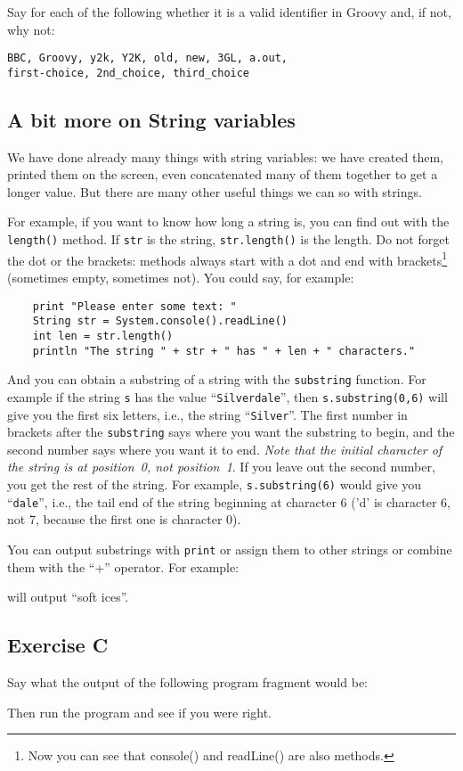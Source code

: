 Say for each of the following whether it is a valid identifier
in Groovy and, if not, why not:
\begin{Verbatim}
BBC, Groovy, y2k, Y2K, old, new, 3GL, a.out, 
first-choice, 2nd_choice, third_choice
\end{Verbatim}

\subsection{A bit more on String variables}

We have done already many things with string variables: we have
created them, printed them on the screen, even concatenated many of
them together to get a longer value. But there are many other useful
things we can so with strings. 

For example, if you want to know how long a string is, you can find
out with the \verb!length()! 
method. If  \verb!str! is the string, \verb!str.length()! is the
length. Do not forget the dot or the brackets: methods always start
with a dot and end with brackets\footnote{Now you can see that
  console() and readLine() are also methods.} (sometimes empty,
sometimes not). You could say, for example:

\begin{Verbatim}
    print "Please enter some text: "
    String str = System.console().readLine()
    int len = str.length()
    println "The string " + str + " has " + len + " characters."
\end{Verbatim}

And you can obtain a substring of a string with the \verb!substring! function.
For example if the string \verb!s! has the value ``\verb!Silverdale!'', then
\verb!s.substring(0,6)! will give you the first six letters, i.e., the string
``\verb!Silver!''.  The first number in brackets after the \verb!substring!
says where you want the substring to begin, and the second number says
where you want it to end. \emph{Note that the initial character of the string
is at position~0, not position~1}.  If you leave out the second number,
you get the rest of the string.  For example, \verb!s.substring(6)! would
give you ``\verb!dale!'', i.e., the tail end of the string beginning at
character 6 ('d' is character 6, not 7, because the first one is
character 0). 

You can output substrings with \verb!print! or assign them to other
strings or combine them with the ``+'' operator.  For example:


will output ``soft ices''.

\subsection*{Exercise C}

Say what the output of the following program fragment would be:


Then run the program and see if you were right. 


